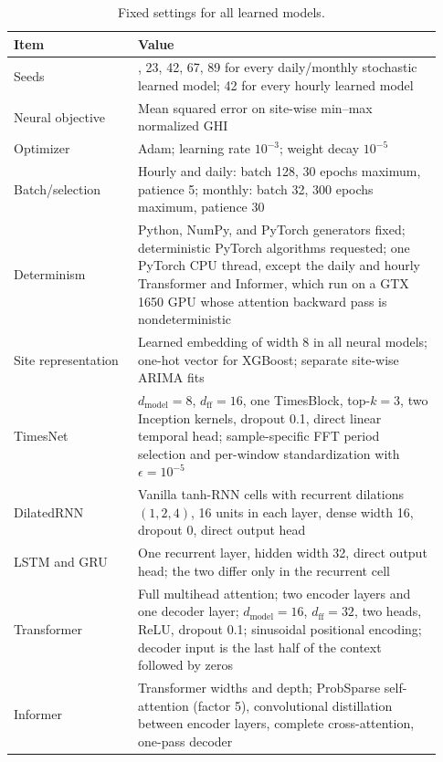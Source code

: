 \begin{table}[!htbp]
\centering
\caption{Fixed settings for all learned models.}
\label{tab:complete_hyperparameters}
\footnotesize
\setlength{\tabcolsep}{3pt}
\renewcommand{\arraystretch}{1.10}
\begin{tabular}{@{}
  >{\raggedright\arraybackslash}p{0.27\linewidth}
  >{\raggedright\arraybackslash}p{0.66\linewidth}@{}}
\toprule
\textbf{Item} & \textbf{Value} \\
\midrule
Seeds & 11, 23, 42, 67, 89 for every daily/monthly stochastic learned
model; 42 for every hourly learned model \\
Neural objective & Mean squared error on site-wise min--max normalized GHI \\
Optimizer & Adam; learning rate $10^{-3}$; weight decay $10^{-5}$ \\
Batch/selection & Hourly and daily: batch 128, 30 epochs maximum, patience 5;
monthly: batch 32, 300 epochs maximum, patience 30 \\
Determinism & Python, NumPy, and PyTorch generators fixed; deterministic
PyTorch algorithms requested; one PyTorch CPU thread, except the daily and
hourly Transformer and Informer, which run on a GTX 1650 GPU whose attention
backward pass is nondeterministic \\
Site representation & Learned embedding of width 8 in all neural models;
one-hot vector for XGBoost; separate site-wise ARIMA fits \\
TimesNet & $d_{\mathrm{model}}=8$, $d_{\mathrm{ff}}=16$, one TimesBlock,
top-$k=3$, two Inception kernels, dropout 0.1, direct linear temporal head;
sample-specific FFT period selection and per-window standardization with
$\epsilon=10^{-5}$ \\
DilatedRNN & Vanilla tanh-RNN cells with recurrent dilations $(1,2,4)$,
16 units in each layer, dense width 16, dropout 0, direct output head \\
LSTM and GRU & One recurrent layer, hidden width 32, direct output head;
the two differ only in the recurrent cell \\
Transformer & Full multihead attention; two encoder layers and one decoder
layer; $d_{\mathrm{model}}=16$, $d_{\mathrm{ff}}=32$, two heads, ReLU,
dropout 0.1; sinusoidal positional encoding; decoder input is the last half
of the context followed by zeros \\
Informer & Transformer widths and depth; ProbSparse self-attention
(factor 5), convolutional distillation between encoder layers, complete
cross-attention, one-pass decoder \\

\end{tabular}
\end{table}
